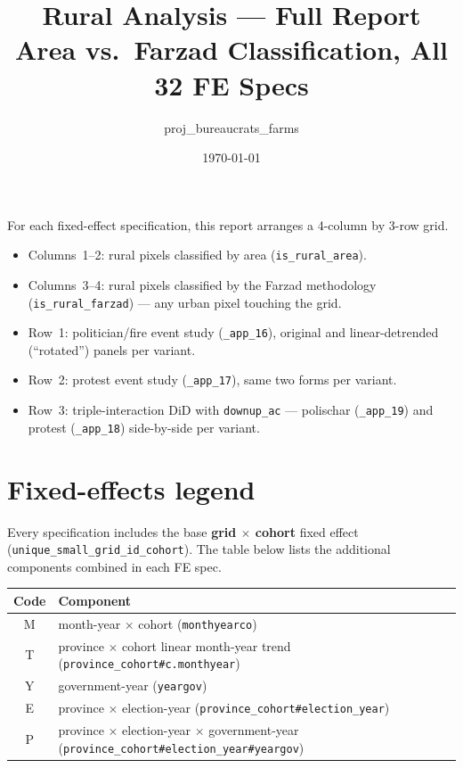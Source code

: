 \documentclass[10pt,landscape]{article}
\title{Rural Analysis --- Full Report\\\large Area vs.\ Farzad Classification, All 32 FE Specs}
\author{proj\_bureaucrats\_farms}
\date{\today}
\begin{document}
\maketitle

\noindent
For each fixed-effect specification, this report arranges a 4-column by
3-row grid.

\begin{itemize}
\itemsep0em
\item Columns~1--2: rural pixels classified by area (\texttt{is\_rural\_area}).
\item Columns~3--4: rural pixels classified by the Farzad methodology
      (\texttt{is\_rural\_farzad}) --- any urban pixel touching the grid.
\item Row~1: politician/fire event study (\texttt{\_app\_16}), original and
      linear-detrended (``rotated'') panels per variant.
\item Row~2: protest event study (\texttt{\_app\_17}), same two forms per variant.
\item Row~3: triple-interaction DiD with \texttt{downup\_ac} ---
      polischar (\texttt{\_app\_19}) and protest (\texttt{\_app\_18})
      side-by-side per variant.
\end{itemize}

\clearpage

\section*{Fixed-effects legend}

\noindent Every specification includes the base \textbf{grid $\times$ cohort}
fixed effect (\texttt{unique\_small\_grid\_id\_cohort}). The table below lists
the additional components combined in each FE spec.

\vspace{0.5em}
\noindent
\begin{tabular}{@{}cl@{}}
\toprule
\textbf{Code} & \textbf{Component} \\
\midrule
M & month-year $\times$ cohort \quad (\texttt{monthyearco}) \\
T & province $\times$ cohort linear month-year trend \quad (\texttt{province\_cohort\#c.monthyear}) \\
Y & government-year \quad (\texttt{yeargov}) \\
E & province $\times$ election-year \quad (\texttt{province\_cohort\#election\_year}) \\
P & province $\times$ election-year $\times$ government-year \quad (\texttt{province\_cohort\#election\_year\#yeargov}) \\
\bottomrule
\end{tabular}
\end{document}
